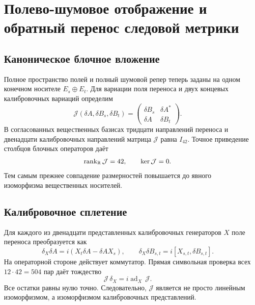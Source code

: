 \chapter{Полево-шумовое отображение и обратный перенос следовой метрики}
\label{ch:v8-field-to-noise-chain-map-pullback-metric-gate}

\section{Каноническое блочное вложение}

Полное пространство полей и полный шумовой репер теперь заданы на одном
конечном носителе $E_s\oplus E_t$. Для вариации поля переноса и двух
концевых калибровочных вариаций определим
\begin{equation}
 \mathcal J(\delta A,\delta B_s,\delta B_t)
 =\begin{pmatrix}
   \delta B_s&\delta A^*\\
   \delta A&\delta B_t
  \end{pmatrix}.
 \label{eq:v8-field-noise-canonical-block-map}
\end{equation}
В согласованных вещественных базисах тридцати направлений переноса и
двенадцати калибровочных направлений матрица $\mathcal J$ равна $I_{42}$.
Точное приведение столбцов блочных операторов даёт
\begin{equation}
 \operatorname{rank}_{\mathbb R}\mathcal J=42,
 \qquad \ker\mathcal J=0.
 \label{eq:v8-field-noise-map-rank}
\end{equation}
Тем самым прежнее совпадение размерностей повышается до явного изоморфизма
вещественных носителей.

\section{Калибровочное сплетение}

Для каждого из двенадцати представленных калибровочных генераторов $X$
поле переноса преобразуется как
\begin{equation}
 \delta_X\delta A=i(X_t\delta A-\delta A X_s),
 \qquad
 \delta_X\delta B_{s,t}=i[X_{s,t},\delta B_{s,t}].
 \label{eq:v8-field-side-gauge-action}
\end{equation}
На операторной стороне действует коммутатор. Прямая символьная проверка
всех $12\cdot42=504$ пар даёт тождество
\begin{equation}
 \mathcal J\,\delta_X=i\operatorname{ad}_X\,\mathcal J.
 \label{eq:v8-field-noise-gauge-intertwining}
\end{equation}
Все остатки равны нулю точно. Следовательно, $\mathcal J$ является не просто
линейным изоморфизмом, а изоморфизмом калибровочных представлений.

